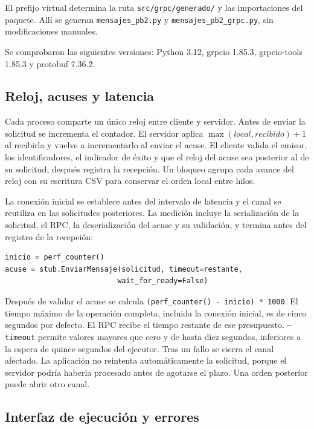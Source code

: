 El prefijo virtual determina la ruta \texttt{src/grpc/generado/} y las
importaciones del paquete. Allí se generan \texttt{mensajes\_pb2.py}
y \texttt{mensajes\_pb2\_grpc.py}, sin modificaciones manuales.

Se comprobaron las siguientes versiones: Python 3.12, grpcio 1.85.3,
grpcio-tools 1.85.3 y protobuf 7.36.2.

\subsection{Reloj, acuses y latencia}

Cada proceso comparte un único reloj entre cliente y servidor.
Antes de enviar la solicitud se incrementa el contador. El servidor
aplica \(\max(local, recibido)+1\) al recibirla y vuelve a incrementarlo
al enviar el acuse. El cliente valida el emisor, los identificadores,
el indicador de éxito y que el reloj del acuse sea posterior al de su
solicitud; después registra la recepción. Un bloqueo agrupa cada avance
del reloj con su escritura CSV para conservar el orden local entre hilos.

La conexión inicial se establece antes del intervalo de latencia y el
canal se reutiliza en las solicitudes posteriores. La medición incluye
la serialización de la solicitud, el RPC, la deserialización del acuse
y su validación, y termina antes del registro de la recepción:

\begin{verbatim}
inicio = perf_counter()
acuse = stub.EnviarMensaje(solicitud, timeout=restante,
                          wait_for_ready=False)
\end{verbatim}

Después de validar el acuse se calcula
\texttt{(perf\_counter() - inicio) * 1000}. El tiempo máximo de la
operación completa, incluida la conexión inicial, es de cinco segundos
por defecto. El RPC recibe el tiempo restante de ese presupuesto.
\texttt{--timeout} permite valores mayores que cero y de hasta diez
segundos, inferiores a la espera de quince segundos del ejecutor.
Tras un fallo se cierra el canal afectado. La aplicación no reintenta
automáticamente la solicitud, porque el servidor podría haberla procesado
antes de agotarse el plazo. Una orden posterior puede abrir otro canal.

\subsection{Interfaz de ejecución y errores}

